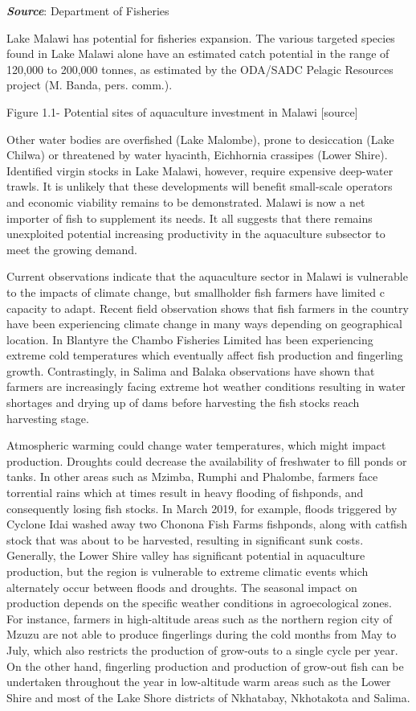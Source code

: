 \documentclass[
]{book}
\begin{document}
\textbf{\emph{Source}}: Department of Fisheries

Lake Malawi has potential for fisheries expansion. The various targeted species found in Lake Malawi alone have an estimated catch potential in the range of
120,000 to 200,000 tonnes, as estimated by the ODA/SADC Pelagic Resources project (M. Banda, pers. comm.).

Figure 1.1- Potential sites of aquaculture investment in Malawi {[}source{]}

Other water bodies are overfished (Lake Malombe), prone to desiccation (Lake Chilwa) or threatened by water hyacinth, Eichhornia crassipes (Lower Shire).
Identified virgin stocks in Lake Malawi, however, require expensive deep-water trawls. It is unlikely that these developments will benefit small-scale operators
and economic viability remains to be demonstrated. Malawi is now a net importer of fish to supplement its needs. It all suggests that there remains unexploited
potential increasing productivity in the aquaculture subsector to meet the growing demand.

Current observations indicate that the aquaculture sector in Malawi is vulnerable to the impacts of climate change, but smallholder fish farmers have limited c
capacity to adapt. Recent field observation shows that fish farmers in the country have been experiencing climate change in many ways depending on geographical
location. In Blantyre the Chambo Fisheries Limited has been experiencing extreme cold temperatures which eventually affect fish production and fingerling growth.
Contrastingly, in Salima and Balaka observations have shown that farmers are increasingly facing extreme hot weather conditions resulting in water shortages and
drying up of dams before harvesting the fish stocks reach harvesting stage.

Atmospheric warming could change water temperatures, which might impact production. Droughts could decrease the availability of freshwater to fill ponds or
tanks. In other areas such as Mzimba, Rumphi and Phalombe, farmers face torrential rains which at times result in heavy flooding of fishponds, and consequently
losing fish stocks. In March 2019, for example, floods triggered by Cyclone Idai washed away two Chonona Fish Farms fishponds, along with catfish stock that was
about to be harvested, resulting in significant sunk costs. Generally, the Lower Shire valley has significant potential in aquaculture production, but the region
is vulnerable to extreme climatic events which alternately occur between floods and droughts. The seasonal impact on production depends on the specific weather
conditions in agroecological zones. For instance, farmers in high-altitude areas such as the northern region city of Mzuzu are not able to produce fingerlings
during the cold months from May to July, which also restricts the production of grow-outs to a single cycle per year. On the other hand, fingerling production
and production of grow-out fish can be undertaken throughout the year in low-altitude warm areas such as the Lower Shire and most of the Lake Shore districts of
Nkhatabay, Nkhotakota and Salima.
\end{document}
